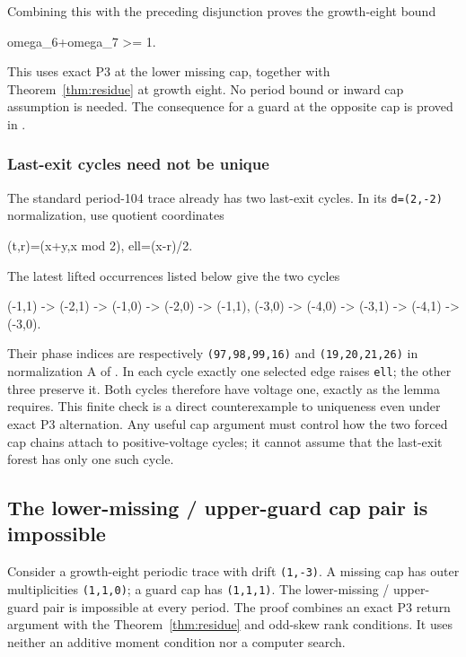 \documentclass[11pt,letterpaper]{article}
\theoremstyle{plain}
\theoremstyle{definition}
\begin{document}
\begin{NoHyper}
Combining this with the preceding disjunction proves the growth-eight bound

\begin{codeblock}
omega_6+omega_7 >= 1.
\end{codeblock}

This uses exact P3 at the lower missing cap, together with Theorem~\ref{thm:residue} at growth eight. No period bound or inward cap assumption is needed. The consequence for a guard at the opposite cap is proved in .

\subsubsection{Last-exit cycles need not be unique}

The standard period-104 trace already has two last-exit cycles. In its \texttt{d=(2,-2)} normalization, use quotient coordinates

\begin{codeblock}
(t,r)=(x+y,x mod 2),       ell=(x-r)/2.
\end{codeblock}

The latest lifted occurrences listed below give the two cycles

\begin{codeblock}
(-1,1) -> (-2,1) -> (-1,0) -> (-2,0) -> (-1,1),
(-3,0) -> (-4,0) -> (-3,1) -> (-4,1) -> (-3,0).
\end{codeblock}

Their phase indices are respectively \texttt{(97,98,99,16)} and \texttt{(19,20,21,26)} in normalization A of . In each cycle exactly one selected edge raises \texttt{ell}; the other three preserve it. Both cycles therefore have voltage one, exactly as the lemma requires. This finite check is a direct counterexample to uniqueness even under exact P3 alternation. Any useful cap argument must control how the two forced cap chains attach to positive-voltage cycles; it cannot assume that the last-exit forest has only one such cycle.


\subsection{The lower-missing / upper-guard cap pair is impossible}

Consider a growth-eight periodic trace with drift \texttt{(1,-3)}. A missing cap has outer multiplicities \texttt{(1,1,0)}; a guard cap has \texttt{(1,1,1)}. The lower-missing / upper-guard pair is impossible at every period. The proof combines an exact P3 return argument with the Theorem~\ref{thm:residue} and odd-skew rank conditions. It uses neither an additive moment condition nor a computer search.


\end{NoHyper}
\end{document}
